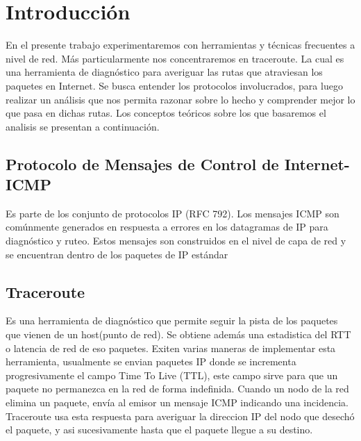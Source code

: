 \section{Introducción}

En el presente trabajo experimentaremos con herramientas y técnicas frecuentes a nivel de red. Más particularmente nos concentraremos en traceroute. La cual es una herramienta de diagnóstico para averiguar las rutas que atraviesan los paquetes en Internet.
Se busca entender los protocolos involucrados, para luego realizar un análisis que nos permita razonar sobre lo hecho y comprender mejor lo que pasa en dichas rutas. Los conceptos teóricos sobre los que basaremos el analisis se presentan a continuación.

\subsection{Protocolo de Mensajes de Control de Internet- ICMP}
Es parte de los conjunto de protocolos IP (RFC 792). Los mensajes ICMP son comúnmente generados en respuesta a errores en los datagramas de IP para diagnóstico y ruteo. Estos mensajes son construidos en el nivel de capa de red y se encuentran dentro de los paquetes de IP estándar

\subsection{Traceroute}

Es una herramienta de diagnóstico que permite seguir la pista de los paquetes que vienen de un host(punto de red). Se obtiene además una estadistica del RTT o latencia de red de eso paquetes.
Exiten varias maneras de implementar esta herramienta, usualmente se envian paquetes IP donde se incrementa progresivamente el campo Time To Live (TTL), este campo sirve para que un paquete no permanezca en la red de forma indefinida. Cuando un nodo de la red elimina un paquete, envía al emisor un mensaje ICMP indicando una incidencia. Traceroute usa esta respuesta para averiguar la direccion IP del nodo que desechó el paquete, y asi sucesivamente hasta que el paquete llegue a su destino.
